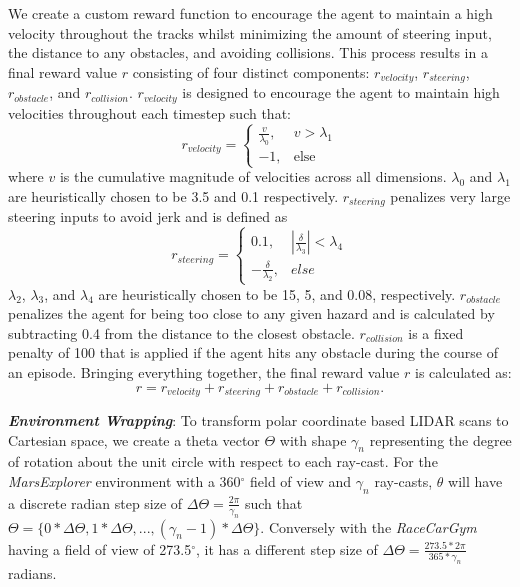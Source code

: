 We create a custom reward function to encourage the agent to maintain a high velocity throughout the tracks whilst minimizing the amount of steering input, the distance to any obstacles, and avoiding collisions. This process results in a final reward value $r$ consisting of four distinct components: $r_{velocity}$, $r_{steering}$, $r_{obstacle}$, and $r_{collision}$. $r_{velocity}$ is designed to encourage the agent to maintain high velocities throughout each timestep such that:
\begin{equation}
    r_{velocity} = \begin{cases}
        \frac{v}{\lambda_0}, & v > \lambda_1 \\
        -1, & \text{else}
    \end{cases}
\end{equation}
where $v$ is the cumulative magnitude of velocities across all dimensions. $\lambda_{0}$ and $\lambda_{1}$ are heuristically chosen to be 3.5 and 0.1 respectively. $r_{steering}$ penalizes very large steering inputs to avoid jerk and is defined as
\begin{equation}
    r_{steering} = \begin{cases}
        0.1, & |\frac{\delta}{\lambda_3}| < \lambda_4 \\
        -\frac{\delta}{\lambda_2}, & else
    \end{cases}
\end{equation}
$\lambda_{2}$, $\lambda_{3}$, and $\lambda_{4}$ are heuristically chosen to be 15, 5, and 0.08, respectively. $r_{obstacle}$ penalizes the agent for being too close to any given hazard and is calculated by subtracting 0.4 from the distance to the closest obstacle. $r_{collision}$ is a fixed penalty of 100 that is applied if the agent hits any obstacle during the course of an episode. Bringing everything together, the final reward value $r$ is calculated as:
\begin{equation}
    r=r_{velocity}+r_{steering}+r_{obstacle}+r_{collision}.
\end{equation}



\textbf{\textit{Environment Wrapping}}: To transform polar coordinate based LIDAR scans to Cartesian space, we create a theta vector $\Theta$ with shape $\gamma_n$ representing the degree of rotation about the unit circle with respect to each ray-cast. For the \textit{MarsExplorer} environment with a 360$^\circ$ field of view and $\gamma_n$ ray-casts, $\theta$ will have a discrete radian step size of $\Delta\Theta=\frac{2\pi}{\gamma_n}$ such that $\Theta=\{0 * \Delta\Theta, 1 * \Delta\Theta, ..., (\gamma_n -1) * \Delta\Theta\}$. Conversely with the \textit{RaceCarGym} having a field of view of 273.5$^{\circ}$, it has a different step size of $\Delta\Theta=\frac{273.5*2\pi}{365*\gamma_n}$ radians.

